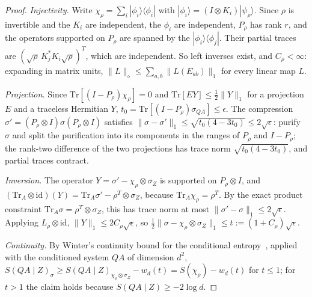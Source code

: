 \documentclass[11pt,a4paper]{article}
\theoremstyle{plain}
\theoremstyle{definition}
\theoremstyle{remark}
\begin{document}
\begin{proof}
\emph{Injectivity.} Write $\chi_\rho=\sum_i|\phi_i\rangle\langle\phi_i|$ with $|\phi_i\rangle=(I\otimes K_i)|\psi_\rho\rangle$. Since $\rho$ is invertible and the $K_i$
are independent, the $\phi_i$ are independent, $P_\rho$ has rank $r$, and the operators supported on $P_\rho$ are spanned by the $|\phi_i\rangle\langle\phi_j|$.
Their partial traces are $(\sqrt\rho\,K_j^*K_i\sqrt\rho)^T$, which are independent. So left inverses exist, and $C_\rho<\infty$: expanding in matrix units,
$\|L\|_\diamond\le\sum_{a,b}\|L(E_{ab})\|_1$ for every linear map $L$.

\emph{Projection.} Since $\mathrm{Tr}[(I-P_\rho)\chi_\rho]=0$ and $\mathrm{Tr}[EY]\le\frac12\|Y\|_1$ for a projection $E$ and a traceless Hermitian $Y$,
$t_0=\mathrm{Tr}[(I-P_\rho)\sigma_{QA}]\le\epsilon$. The compression $\sigma'=(P_\rho\otimes I)\sigma(P_\rho\otimes I)$ satisfies
$\|\sigma-\sigma'\|_1\le\sqrt{t_0(4-3t_0)}\le2\sqrt\epsilon$: purify $\sigma$ and split the purification into its components in the ranges of $P_\rho$ and
$I-P_\rho$; the rank-two difference of the two projections has trace norm $\sqrt{t_0(4-3t_0)}$, and partial traces contract.

\emph{Inversion.} The operator $Y=\sigma'-\chi_\rho\otimes\sigma_Z$ is supported on $P_\rho\otimes I$, and $(\mathrm{Tr}_A\otimes\mathrm{id})(Y)=\mathrm{Tr}_A\sigma'-\rho^T\otimes\sigma_Z$,
because $\mathrm{Tr}_A\chi_\rho=\rho^T$. By the exact product constraint $\mathrm{Tr}_A\sigma=\rho^T\otimes\sigma_Z$, this has trace norm at most
$\|\sigma'-\sigma\|_1\le2\sqrt\epsilon$. Applying $L_\rho\otimes\mathrm{id}$, $\|Y\|_1\le2C_\rho\sqrt\epsilon$, so $\frac12\|\sigma-\chi_\rho\otimes\sigma_Z\|_1\le t:=(1+C_\rho)\sqrt\epsilon$.

\emph{Continuity.} By Winter's continuity bound for the conditional entropy~\cite[Lemma~2]{Winter2016}, applied with the conditioned system $QA$ of
dimension $d^2$, $S(QA\mid Z)_\sigma\ge S(QA\mid Z)_{\chi_\rho\otimes\sigma_Z}-w_d(t)=S(\chi_\rho)-w_d(t)$ for $t\le1$; for $t>1$ the claim holds because
$S(QA\mid Z)\ge-2\log d$.
\end{proof}
\end{document}
